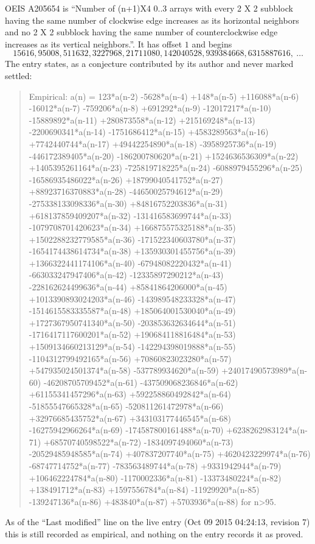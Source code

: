 \documentclass[11pt,a4paper]{article}
\theoremstyle{plain}
\theoremstyle{definition}
\begin{document}
OEIS A205654 is ``Number of (n+1)X4 0..3 arrays with every 2 X 2 subblock having the same number of clockwise edge increases as its horizontal neighbors and no 2 X 2 subblock having the same number of counterclockwise edge increases as its vertical neighbors.''. It has offset $1$ and begins
\[
15616, 95008, 511632, 3227968, 21711080, 142040528, 939384668, 6315887616,\ \dots
\]
The entry states, as a conjecture contributed by its author and never marked settled:
\begin{quote}
Empirical: a(n) = 123*a(n-2) -5628*a(n-4) +148*a(n-5) +116088*a(n-6) -16012*a(n-7) -759206*a(n-8) +691292*a(n-9) -12017217*a(n-10) -15889892*a(n-11) +280873558*a(n-12) +215169248*a(n-13) -2200690341*a(n-14) -1751686412*a(n-15) +4583289563*a(n-16) +7742440744*a(n-17) +49442254890*a(n-18) -3958925736*a(n-19) -446172389405*a(n-20) -186200780620*a(n-21) +1524636536309*a(n-22) +1405395261164*a(n-23) -725819718225*a(n-24) -6088979455296*a(n-25) -16586935486022*a(n-26) +18799040541752*a(n-27) +88923716370883*a(n-28) -44650025794612*a(n-29) -275338133098336*a(n-30) +84816752203836*a(n-31) +618137859409207*a(n-32) -131416583699744*a(n-33) -1079708701420623*a(n-34) +166875575325188*a(n-35) +1502288232779585*a(n-36) -171522340603780*a(n-37) -1654174438614734*a(n-38) +135930301455756*a(n-39) +1366322441174106*a(n-40) -67948082220432*a(n-41) -663033247947406*a(n-42) -12335897290212*a(n-43) -228162624499636*a(n-44) +85841864206000*a(n-45) +1013390893024203*a(n-46) -143989548233328*a(n-47) -1514615583335587*a(n-48) +185064001530040*a(n-49) +1727367950741340*a(n-50) -203853632634644*a(n-51) -1716417117600201*a(n-52) +190684118816484*a(n-53) +1509134660213129*a(n-54) -142294398019888*a(n-55) -1104312799492165*a(n-56) +70860823023280*a(n-57) +547935024501374*a(n-58) -537789934620*a(n-59) +24017490573989*a(n-60) -46208705709452*a(n-61) -437509068236846*a(n-62) +61155341457296*a(n-63) +592258860492842*a(n-64) -51855547665328*a(n-65) -520811261472978*a(n-66) +32976685435752*a(n-67) +343103177446545*a(n-68) -16275942966264*a(n-69) -174587800161488*a(n-70) +6238262983124*a(n-71) +68570740598522*a(n-72) -1834097494060*a(n-73) -20529485948585*a(n-74) +407837207740*a(n-75) +4620423229974*a(n-76) -68747714752*a(n-77) -783563489744*a(n-78) +9331942944*a(n-79) +106462224784*a(n-80) -1170002336*a(n-81) -13373480224*a(n-82) +138491712*a(n-83) +1597556784*a(n-84) -11929920*a(n-85) -139247136*a(n-86) +483840*a(n-87) +5703936*a(n-88) for n>95.
\end{quote}
As of the ``Last modified'' line on the live entry (Oct 09 2015 04:24:13, revision 7) this is still
recorded as empirical, and nothing on the entry records it as proved.
\end{document}
